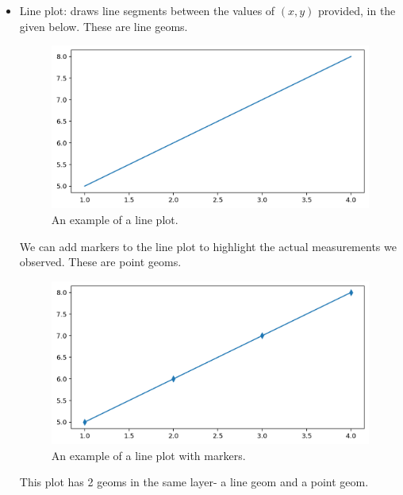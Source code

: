 \documentclass[a4paper, openany]{memoir}
\begin{document}
\begin{itemize}
    \item Line plot: draws line segments between the values of $(x, y)$ provided, in the given below. These are line geoms.
    \begin{figure}[H]
        \centering
        \includegraphics[scale=0.4]{src/2.7 line plot example.png}
        \caption{An example of a line plot.}
    \end{figure}
    We can add markers to the line plot to highlight the actual measurements we observed. These are point geoms.
    \begin{figure}[H]
        \centering
        \includegraphics[scale=0.4]{src/2.8 line plot example with markers.png}
        \caption{An example of a line plot with markers.}
    \end{figure}
    This plot has 2 geoms in the same layer- a line geom and a point geom.
    

\end{itemize}
\end{document}
